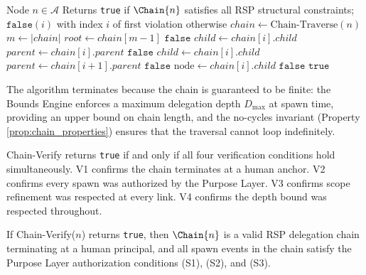 \begin{algorithm}[htbp]
\caption{Chain-Verify($n$)}
\label{alg:chain_verify}
\begin{algorithmic}[1]
\Require Node $n \in \mathcal{A}$
\Ensure Returns \texttt{true} if $\Chain{n}$ satisfies all RSP structural constraints; $\texttt{false}(i)$ with index $i$ of first violation otherwise
\State $chain \gets \text{Chain-Traverse}(n)$
\State $m \gets |chain|$
\Statex
{}
\State $root \gets chain[m-1]$
    \State \Return $\texttt{false}$ 
\EndIf
\Statex
{}
    \State $child \leftarrow chain[i].child$
    \State $parent \leftarrow chain[i].parent$
        \State \Return $\texttt{false}$ 
    \EndIf
\EndFor
\Statex
{}
    \State $child \leftarrow chain[i].child$
    \State $parent \leftarrow chain[i+1].parent$
        \State \Return $\texttt{false}$ 
    \EndIf
\EndFor
\Statex
{}
    \State $\text{node} \gets chain[i].child$
        \State \Return $\texttt{false}$ 
    \EndIf
\EndFor
\State \Return $\texttt{true}$
\end{algorithmic}
\end{algorithm}

The algorithm terminates because the chain is guaranteed to be finite: the Bounds Engine enforces a maximum delegation depth $D_{\max}$ at spawn time, providing an upper bound on chain length, and the no-cycles invariant (Property \ref{prop:chain_properties}) ensures that the traversal cannot loop indefinitely.

Chain-Verify returns \texttt{true} if and only if all four verification conditions hold simultaneously. V1 confirms the chain terminates at a human anchor. V2 confirms every spawn was authorized by the Purpose Layer. V3 confirms scope refinement was respected at every link. V4 confirms the depth bound was respected throughout.

\begin{prop}
\label{prop:chain_verify_soundness}
If Chain-Verify($n$) returns \texttt{true}, then $\Chain{n}$ is a valid RSP delegation chain terminating at a human principal, and all spawn events in the chain satisfy the Purpose Layer authorization conditions (S1), (S2), and (S3).
\end{prop}

